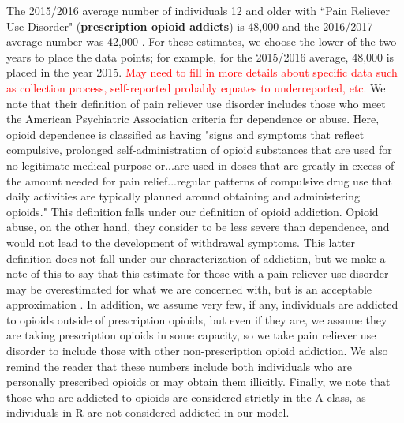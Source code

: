 \documentclass[12pt]{article}
\begin{document}
The 2015/2016 average number of individuals 12 and older with ``Pain Reliever Use Disorder" (\textbf{prescription opioid addicts}) is 48,000 and the 2016/2017 average number was 42,000 \cite{NSDUH2, NSDUH3}. For these estimates, we choose the lower of the two years to place the data points; for example, for the 2015/2016 average, 48,000 is placed in the year 2015. \textcolor{red}{May need to fill in more details about specific data such as collection process, self-reported probably equates to underreported, etc.}
We note that their definition of pain reliever use disorder includes those who meet the American Psychiatric Association criteria for dependence or abuse. Here, opioid dependence is classified as having "signs and symptoms that reflect compulsive, prolonged self-administration of opioid substances that are used for no legitimate medical purpose or...are used in doses that are greatly in excess of the amount needed for pain relief...regular patterns of compulsive drug use that daily activities are typically planned around obtaining and administering opioids." This definition falls under our definition of opioid addiction. Opioid abuse, on the other hand, they consider to be less severe than dependence, and would not lead to the development of withdrawal symptoms. This latter definition does not fall under our characterization of addiction, but we make a note of this to say that this estimate for those with a pain reliever use disorder may be overestimated for what we are concerned with, but is an acceptable approximation \cite{DSM}. In addition, we assume very few, if any, individuals are addicted to opioids outside of prescription opioids, but even if they are, we assume they are taking prescription opioids in some capacity, so we take pain reliever use disorder to include those with other non-prescription opioid addiction. We also remind the reader that these numbers include both individuals who are personally prescribed opioids or may obtain them illicitly. Finally, we note that those who are addicted to opioids are considered strictly in the A class, as individuals in R are not considered addicted in our model. \\
\end{document}
